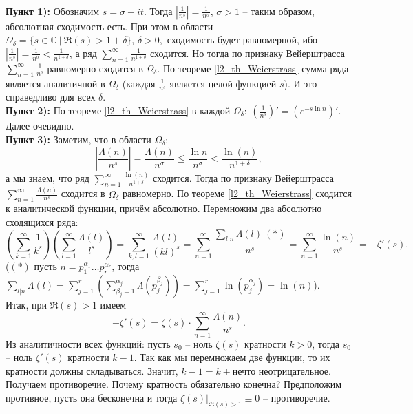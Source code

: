\begin{pf}~\\
	\textbf{Пункт 1):} Обозначим $s=\sigma+it.$ Тогда $\displaystyle \left| \frac{1}{n^s} \right| = \frac{1}{n^\sigma},\,\sigma > 1$ -- таким образом, абсолютная сходимость есть. При этом в области $\Omega_\delta = \{ s \in \mathbb{C} \ | \ \Re(s) > 1+\delta \},\, \delta>0,$ сходимость будет равномерной, ибо $\displaystyle \left| \frac{1}{n^s} \right| = \frac{1}{n^\sigma} < \frac{1}{n^{1+\delta}}$, а ряд $\displaystyle \sum\limits_{n=1}^\infty \frac{1}{n^{1+\delta}}$ сходится. Но тогда по признаку Вейерштрасса $\displaystyle \sum\limits_{n=1}^\infty \frac{1}{n^s}$ равномерно сходится в $\Omega_\delta.$ По теореме \ref{l2_th_Weierstrass} сумма ряда является аналитичной в $\Omega_\delta$ (каждая $\displaystyle \frac{1}{n^s}$ является целой функцией $s$). И это справедливо для всех $\delta$.\\
	\textbf{Пункт 2):} По теореме \ref{l2_th_Weierstrass} в каждой $\displaystyle \Omega_\delta: \ \left(\frac{1}{n^s}\right)' = \left(e^{-s \ln n}\right)'.$ Далее очевидно.\\
	\textbf{Пункт 3):} Заметим, что в области $\displaystyle \Omega_\delta:$ $$\left| \frac{\Lambda(n)}{n^s} \right| = \frac{\Lambda(n)}{n^\sigma} \leq \frac{\ln n}{n^\sigma} < \frac{\ln(n)}{n^{1+\delta}},$$ а мы знаем, что ряд $\displaystyle \sum\limits_{n=1}^\infty \frac{\ln(n)}{n^{1+\delta}}$ сходится. Тогда по признаку Вейерштрасса $\displaystyle \sum\limits_{n=1}^\infty \frac{\Lambda(n)}{n^s}$ сходится в $\Omega_\delta$ равномерно. По теореме \ref{l2_th_Weierstrass} сходится к аналитической функции, причём абсолютно. Перемножим два абсолютно сходящихся ряда:
		$$\left( \sum\limits_{k=1}^\infty \frac{1}{k^s} \right)\left( \sum\limits_{l=1}^\infty \frac{\Lambda(l)}{l^s} \right) = \sum\limits_{k,l=1}^\infty \frac{\Lambda(l)}{(kl)^s} = \sum\limits_{n=1}^\infty \frac{\sum_{l | n}\Lambda(l) \ (\ast)}{n^s} = \sum\limits_{n=1}^\infty \frac{\ln(n)}{n^s} = -\zeta'(s).$$
		($(\ast)$ пусть $n = p_1^{\alpha_1}\dots p_r^{\alpha_r}$, тогда $\displaystyle \sum\limits_{l | n}\Lambda(l) = \sum\limits_{j=1}^r \left( \sum\limits_{\beta_j=1}^{\alpha_j} \Lambda\left(p_j^{\beta_j} \right) \right) = \sum\limits_{j=1}^r \ln\left( p_j^{\alpha_j} \right) = \ln(n)$).\\
	Итак, при $\Re(s)>1$ имеем
		$$-\zeta'(s) = \zeta(s) \cdot \sum\limits_{n=1}^\infty \frac{\Lambda(n)}{n^s}.$$
	Из аналитичности всех функций: пусть $s_0$ -- ноль $\zeta(s)$ кратности $k>0$, тогда $s_0$ -- ноль $\zeta'(s)$ кратности $k-1$. Так как мы перемножаем две функции, то их кратности должны складываться. Значит, $k-1=k+$нечто неотрицательное.  Получаем противоречие. Почему кратность обязательно конечна? Предположим противное, пусть она бесконечна и тогда $\zeta(s)|_{\Re(s)>1} \equiv 0$ -- противоречие.
\end{pf}

